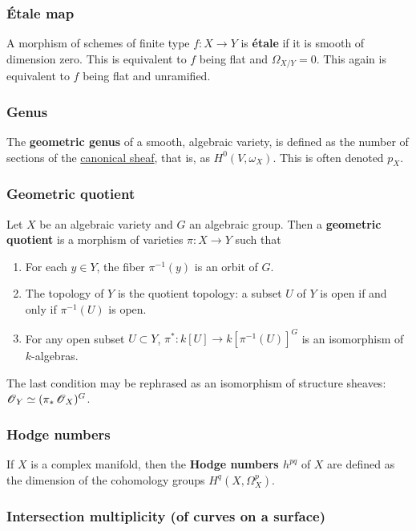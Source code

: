 \documentclass[11pt, english]{article}
\begin{document}
\subsubsection{Étale map}
\label{etalemap}

A morphism of schemes of finite type $f:X \to Y$ is \textbf{étale} if it is smooth of dimension zero. This is equivalent to $f$ being flat and $\Omega_{X/Y}=0$. This again is equivalent to $f$ being flat and unramified.

\subsubsection{Genus}
\label{genus}
 
The \textbf{geometric genus} of a smooth, algebraic variety, is defined as the number of sections of the \hyperref[canonicalsheaf]{canonical sheaf}, that is, as $H^0(V,\omega_X)$. This is often denoted $p_X$.

\subsubsection{Geometric quotient}
\label{geometricquotient}

Let $X$ be an algebraic variety and $G$ an algebraic group. Then a \textbf{geometric quotient} is a morphism of varieties $\pi:X \to Y$ such that
\begin{enumerate}
\item For each $y \in Y$, the fiber $\pi^{-1}(y)$ is an orbit of $G$.
\item The topology of $Y$ is the quotient topology: a subset $U$ of $Y$ is open if and only if $\pi^{-1}(U)$ is open.
\item For any open subset $U \subset Y$, $\pi^\ast: k[U] \to k[\pi^{-1}(U)]^G$ is an isomorphism of $k$-algebras.
\end{enumerate}
The last condition may be rephrased as an isomorphism of structure sheaves: $\operatorname{\mathscr{O}}_Y \simeq (\pi_\ast \operatorname{\mathscr{O}}_X)^G$.   

\subsubsection{Hodge numbers}
\label{hodgenumbers}

If $X$ is a complex manifold, then the \textbf{Hodge numbers $h^{pq}$} of $X$ are defined as the dimension of the cohomology groups $H^q(X,\Omega_X^p)$.

\subsubsection{Intersection multiplicity (of curves on a surface)}
\label{intersectionmult}
\end{document}
